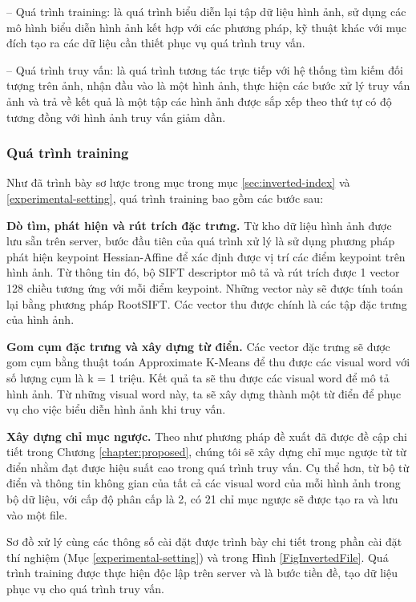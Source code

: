 -- Quá trình training: là quá trình biểu diễn lại tập dữ liệu hình ảnh, sử dụng các mô hình biểu diễn hình ảnh kết hợp với các phương pháp, kỹ thuật khác với mục đích tạo ra các dữ liệu cần thiết phục vụ quá trình truy vấn.

-- Quá trình truy vấn: là quá trình tương tác trực tiếp với hệ thống tìm kiếm đối tượng trên ảnh, nhận đầu vào là một hình ảnh, thực hiện các bước xử lý truy vấn ảnh và trả về kết quả là một tập các hình ảnh được sắp xếp theo thứ tự có độ tương đồng với hình ảnh truy vấn giảm dần.

\subsubsection{Quá trình training}
Như đã trình bày sơ lược trong mục trong mục \ref{sec:inverted-index} và \ref{experimental-setting}, quá trình training bao gồm các bước sau:

\textbf{Dò tìm, phát hiện và rút trích đặc trưng.} Từ kho dữ liệu hình ảnh được lưu sẵn trên server, bước đầu tiên của quá trình xử lý là sử dụng phương pháp phát hiện keypoint Hessian-Affine để xác định được vị trí các điểm keypoint trên hình ảnh. Từ thông tin đó, bộ SIFT descriptor mô tả và rút trích được 1 vector 128 chiều tương ứng với mỗi điểm keypoint. Những vector này sẽ được tính toán lại bằng phương pháp RootSIFT\cite{philbin2007object}. Các vector thu được chính là các tập đặc trưng của hình ảnh. 

\textbf{Gom cụm đặc trưng và xây dựng từ điển.} Các vector đặc trưng sẽ được gom cụm bằng thuật toán Approximate K-Means\cite{philbin2007object} để thu được các visual word với số lượng cụm là k = 1 triệu. Kết quả ta sẽ thu được các visual word để mô tả hình ảnh. Từ những visual word này, ta sẽ xây dựng thành một từ điển để phục vụ cho việc biểu diễn hình ảnh khi truy vấn.

\textbf{Xây dựng chỉ mục ngược.} Theo như phương pháp đề xuất đã được đề cập chi tiết trong Chương \ref{chapter:proposed}, chúng tôi sẽ xây dựng chỉ mục ngược từ từ điển nhằm đạt được hiệu suất cao trong quá trình truy vấn. Cụ thể hơn, từ bộ từ điển và thông tin không gian của tất cả các visual word của mỗi hình ảnh trong bộ dữ liệu, với cấp độ phân cấp là 2, có 21 chỉ mục ngược sẽ được tạo ra và lưu vào một file.

Sơ đồ xử lý cùng các thông số cài đặt được trình bày chi tiết trong phần cài đặt thí nghiệm (Mục \ref{experimental-setting}) và trong Hình \ref{FigInvertedFile}. Quá trình training được thực hiện độc lập trên server và là bước tiền đề, tạo dữ liệu phục vụ cho quá trình truy vấn.

